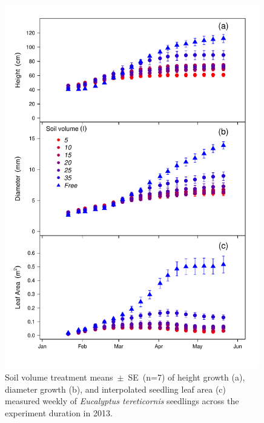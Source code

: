 \documentclass[a4paper]{article}\usepackage[]{graphicx}\usepackage[]{color}
\begin{document}
\begin{figure}[h!]
    \centering
    \includegraphics[width=0.99\textwidth]{allometry.pdf}
    \caption{Soil volume treatment means~$\pm$~SE~(n=7) of height growth (a), diameter growth (b), and interpolated seedling leaf area (c) measured weekly of \textit{Eucalyptus tereticornis} seedlings across the experiment duration in 2013.}
    \label{fig:figure2}
\end{figure}
\end{document}
